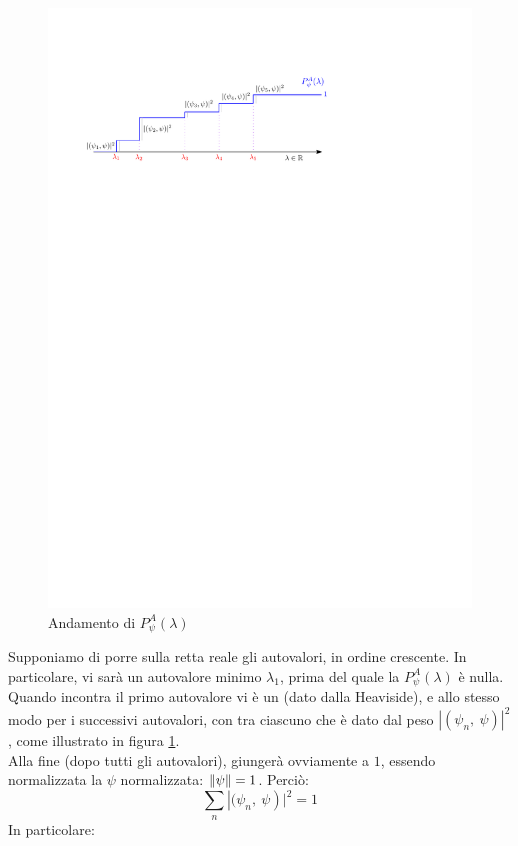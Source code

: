 \documentclass[../../FisicaTeorica.tex]{subfiles}
\begin{document}
\begin{figure}
    \centering
    \includegraphics{Immagini/Heaviside.pdf}
    \caption{Andamento di $P_\psi^A(\lambda)$}
    \label{fig:Pautov}
\end{figure}
Supponiamo di porre sulla retta reale gli autovalori, in ordine crescente. In particolare, vi sarà un autovalore minimo $\lambda_1$, prima del quale la $P_\psi^A\left(\lambda\right)$ è nulla. Quando incontra il primo autovalore vi è un  (dato dalla Heaviside), e allo stesso modo per i successivi autovalori, con  tra ciascuno che è dato dal peso $\left|(\psi_n,\ \psi)\right|^2$, come illustrato in figura \ref{fig:Pautov}.\\
Alla fine (dopo tutti gli autovalori), giungerà ovviamente a $1$, essendo normalizzata la $\psi$ normalizzata: $\left\lVert\psi\right\rVert=1$. Perciò:
\[
\sum_{n}\left|(\psi_n,\ \psi\right)|^2=1
\]
In particolare:
\end{document}
